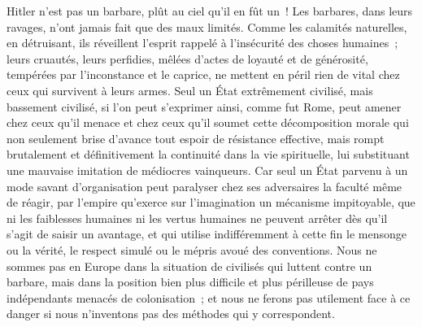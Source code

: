 \documentclass[french,twoside]{book} %
\begin{document}
\noindent Hitler n'est pas un barbare, plût au ciel qu'il en fût un ! Les barbares, dans leurs ravages, n'ont jamais fait que des maux limités. Comme les calamités naturelles, en détruisant, ils réveillent l'esprit rappelé à l'insécurité des choses humaines ; leurs cruautés, leurs perfidies, mêlées d'actes de loyauté et de générosité, tempérées par l'inconstance et le caprice, ne mettent en péril rien de vital chez ceux qui survivent à leurs armes. Seul un État extrêmement civilisé, mais bassement civilisé, si l'on peut s'exprimer ainsi, comme fut Rome, peut amener chez ceux qu'il menace et chez ceux qu'il soumet cette décomposition morale qui non seulement brise d'avance tout espoir de résistance effective, mais rompt brutalement et définitivement la continuité dans la vie spirituelle, lui substituant une mauvaise imitation de médiocres vainqueurs. Car seul un État parvenu à un mode savant d'organisation peut paralyser chez ses adversaires la faculté même de réagir, par l'empire qu'exerce sur l'imagination un mécanisme impitoyable, que ni les faiblesses humaines ni les vertus humaines ne peuvent arrêter dès qu'il s'agit de saisir un avantage, et qui utilise indifféremment à cette fin le mensonge ou la vérité, le respect simulé ou le mépris avoué des conventions. Nous ne sommes pas en Europe dans la situation de civilisés qui luttent contre un barbare, mais dans la position bien plus difficile et plus périlleuse de pays indépendants menacés de colonisation ; et nous ne ferons pas utilement face à ce danger si nous n'inventons pas des méthodes qui y correspondent.\par

\begin{center}
\noindent \centerline{}
\end{center}
\end{document}
